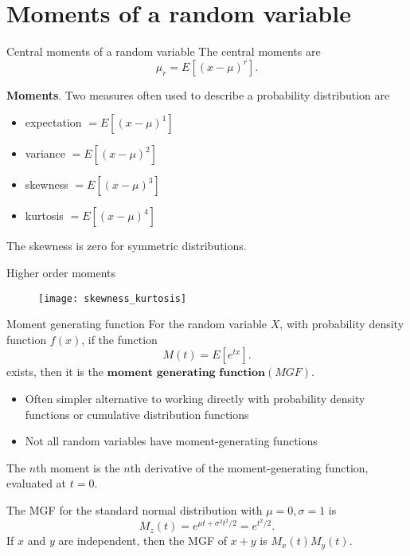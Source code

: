 \documentclass[11pt,table]{beamer}
\begin{document}
\section{Moments of a random variable}

\begin{frame}{Central moments of a random variable}
The central moments are
 \begin{equation*}
    \mu_{r} = E[(x - \mu)^{r}].
 \end{equation*}
\small
\begin{example} \textbf{Moments}. 
Two measures often used to describe a probability distribution are
\begin{itemize}
	\item expectation $= E[(x - \mu)^{1}]$
	\item variance $= E[(x - \mu)^{2}]$
	\item skewness $= E[(x - \mu)^{3}]$
	\item kurtosis $= E[(x - \mu)^{4}]$
\end{itemize}
The skewness is zero for symmetric distributions.
\end{example}

\end{frame}

\begin{frame}{Higher order moments}
\begin{figure}[H]
\begin{center}
{\texttt{[image: skewness\_kurtosis]}}\label{skewness_kurtosis}
\end{center}
\end{figure}
\end{frame}

\begin{frame}{Moment generating function}
For the random variable $X$, with probability density function $f(x)$, if the function
\begin{equation*}
    M(t) = E[e^{tx}].
\end{equation*}
exists, then it is the $\textbf{moment generating function}(MGF)$.

\begin{itemize}
	\item Often simpler alternative to working directly with probability density functions or cumulative distribution functions
	\item Not all random variables have moment-generating functions
\end{itemize}
The $n$th moment is the $n$th derivative of the moment-generating function, evaluated at $t=0$. 

\begin{example}
The MGF for the standard normal distribution with $\mu=0, \sigma=1$ is $$M_{z}(t) = e^{\mu t+ \sigma^2t^{2}/2} = e^{t^{2}/2}.$$
If $x$ and $y$ are independent, then the MGF of $x + y$ is $M_{x}(t)M_{y}(t).$
\end{example}
\end{frame}
\end{document}
